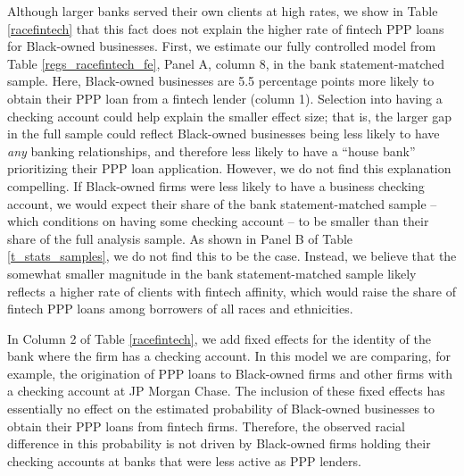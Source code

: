 \documentclass[11pt]{article}
\begin{document}
Although larger banks served their own clients at high rates, we show in Table \ref{racefintech} that this fact does not explain the higher rate of fintech PPP loans for Black-owned businesses. First, we estimate our fully controlled model  from Table \ref{regs_racefintech_fe}, Panel A, column 8, in the bank statement-matched sample. Here, Black-owned businesses are 5.5 percentage points more likely to obtain their PPP loan from a fintech lender (column 1). Selection into having a checking account could help explain the smaller effect size; that is, the larger gap in the full sample could reflect Black-owned businesses being less likely to have \textit{any} banking relationships, and therefore less likely to have a ``house bank'' prioritizing their PPP loan application. However, we do not find this explanation compelling. If Black-owned firms were less likely to have a business checking account, we would expect their share of the bank statement-matched sample -- which conditions on having some checking account -- to be smaller than their share of the full analysis sample. As shown in Panel B of Table \ref{t_stats_samples}, we do not find this to be the case. Instead, we believe that the somewhat smaller magnitude in the bank statement-matched sample likely reflects a higher rate of clients with fintech affinity, which would raise the share of fintech PPP loans among borrowers of all races and ethnicities.

In Column 2 of Table \ref{racefintech}, we add fixed effects for the identity of the bank where the firm has a checking account. In this model we are comparing, for example, the origination of PPP loans to Black-owned firms and other firms with a checking account at JP Morgan Chase. The inclusion of these fixed effects has essentially no effect on the estimated probability of Black-owned businesses to obtain their PPP loans from fintech firms. Therefore, the observed racial difference in this probability is not driven by Black-owned firms holding their checking accounts at banks that were less active as PPP lenders.
\end{document}
